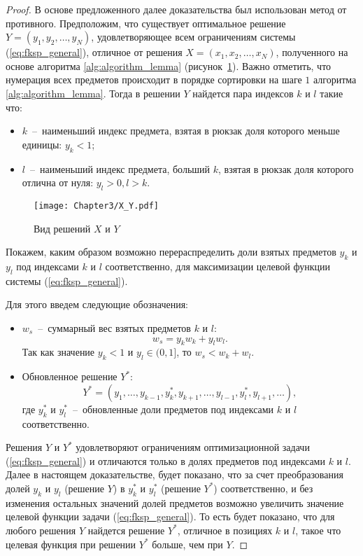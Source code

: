 \begin{proof}

В основе предложенного далее доказательства был использован метод от противного. Предположим, что существует оптимальное решение $Y = (y_1, y_2, \ldots, y_N)$, удовлетворяющее всем ограничениям системы (\ref{eq:fksp_general}), отличное от решения $X = (x_1, x_2, \ldots, x_N)$, полученного на основе алгоритма \ref{alg:algorithm_lemma} (рисунок~\ref{fig:X_Y_Solutions}). Важно отметить, что нумерация всех предметов происходит в порядке сортировки на шаге $1$ алгоритма \ref{alg:algorithm_lemma}. Тогда в решении $Y$ найдется пара индексов $k$ и $l$ такие что:
\begin{itemize}
	\item $k$~--~наименьший индекс предмета, взятая в рюкзак доля которого меньше единицы: $y_k < 1$;
	\item $l$~--~наименьший индекс предмета, больший $k$, взятая в рюкзак доля которого отлична от нуля: $y_l > 0, l>k$.
\end{itemize}

\begin{figure}[htbp]
\begin{center}
\texttt{[image: Chapter3/X\_Y.pdf]}
\caption{Вид решений $X$ и $Y$}
\label{fig:X_Y_Solutions}
\end{center}
\end{figure}

Покажем, каким образом возможно перераспределить доли взятых предметов $y_k$ и $y_l$ под индексами $k$ и $l$ соответственно, для максимизации целевой функции системы (\ref{eq:fksp_general}).

Для этого введем следующие обозначения:
\begin{itemize}
	\item $w_{s}$~--~суммарный вес взятых предметов $k$ и $l$: $$w_{s} = y_k w_k + y_l w_l.$$ Так как значение $y_k < 1$ и $y_l \in (0, 1]$, то $w_{s} < w_k + w_l$.
	\item Обновленное решение $Y^{*}$: $$Y^{*}=(y_1, \ldots, y_{k-1}, y_k^{*}, y_{k+1}, \ldots, y_{l-1}, y_l^{*}, y_{l+1}, \ldots),$$ где $y_k^{*}$ и $y_l^{*}$~--~обновленные доли предметов под индексами $k$ и $l$ соответственно.
\end{itemize}

Решения $Y$ и $Y^{*}$ удовлетворяют ограничениям оптимизационной задачи (\ref{eq:fksp_general}) и отличаются только в долях предметов под индексами $k$ и $l$. Далее в настоящем доказательстве, будет показано, что за счет преобразования долей $y_k$ и $y_l$ (решение $Y$) в $y_k^{*}$ и $y_l^{*}$ (решение $Y^{*}$) соответственно, и без изменения остальных значений долей предметов возможно увеличить значение целевой функции задачи (\ref{eq:fksp_general}). То есть будет показано, что для любого решения $Y$ найдется решение $Y^{*}$, отличное в позициях $k$ и $l$, такое что целевая функция при решении $Y^{*}$ больше, чем при $Y$.


\end{proof}
